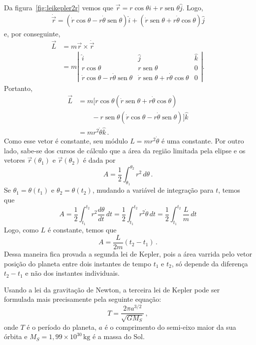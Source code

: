 \documentclass[twocolumn=on,fontsize=12pt,DIV=calc]{scrartcl}
\theoremstyle{definition}
\DeclareMathOperator{\sen}{sen}
\begin{document}
Da figura~\ref{fig:leikepler2r} vemos que
$\vec r=r\cos\theta\hat i+r\sen\theta\hat j$. Logo,
\begin{equation*}
  \begin{split}
    \dot{\vec r}=(\dot r\cos\theta-r\dot\theta\sen\theta)\hat i+(\dot
    r\sen\theta+r\dot\theta\cos\theta)\hat j
  \end{split}
\end{equation*}
e, por conseguinte,
\begin{equation*}
  \begin{split}
    \vec L&=m\vec r\times\dot{\vec r}\\
    &=m\!\left|
  \begin{array}{ccc}
    \hat i&\hat j&\hat k\\
    r\cos\theta& r\sen\theta& 0\\
    \dot r\cos\theta\!-\!r\dot\theta\sen\theta& \dot r\sen\theta\!+\!r\dot\theta\cos\theta&0
  \end{array}
  \right|.
  \end{split}
\end{equation*}
Portanto,
\begin{equation*}
  \begin{split}
    \vec L&=m[r\cos\theta(\dot r\sen\theta+r\dot\theta\cos\theta)\\
    &\qquad-r\sen\theta(\dot r\cos\theta-r\dot\theta\sen\theta)]\hat k\\
    &=mr^2\dot\theta\hat k\,.
  \end{split}
\end{equation*}
Como esse vetor é constante, seu módulo $L=mr^2\dot\theta$ é uma
constante. Por outro lado, sabe-se dos cursos de cálculo que a área da
região limitada pela elipse e os vetores $\vec r(\theta_1)$ e
$\vec r(\theta_2)$ é dada por
$$A=\frac{1}{2}\int_{\theta_1}^{\theta_2}r^2\,d\theta\,.$$
Se $\theta_1=\theta(t_1)$ e $\theta_2=\theta(t_2)$, mudando a variável
de integração para $t$, temos que
$$A=\frac{1}{2}\int_{t_1}^{t_2}r^2\frac{d\theta}{dt}\,dt=\frac{1}{2}\int_{t_1}^{t_2}r^2\dot\theta\,dt=\frac{1}{2}\int_{t_1}^{t_2}\frac{L}{m}\,dt$$
Logo, como $L$ é constante, temos que
$$A=\frac{L}{2m}(t_2-t_1)\,.$$
Dessa maneira fica provada a segunda lei de Kepler, pois a área
varrida pelo vetor posição do planeta entre dois instantes de tempo
$t_1$ e $t_2$, só depende da diferença $t_2-t_1$ e não dos instantes
individuais.

Usando a lei da gravitação de Newton, a terceira lei de Kepler pode
ser formulada mais precisamente pela seguinte equação:
$$T=\frac{2\pi a^{3/2}}{\sqrt{GM_S}}\,,$$
onde $T$ é o período do planeta, $a$ é o comprimento do semi-eixo
maior da sua órbita e $M_S=1{,}99\times 10^{30}\,\mathrm{kg}$ é a
massa do Sol.
\end{document}
